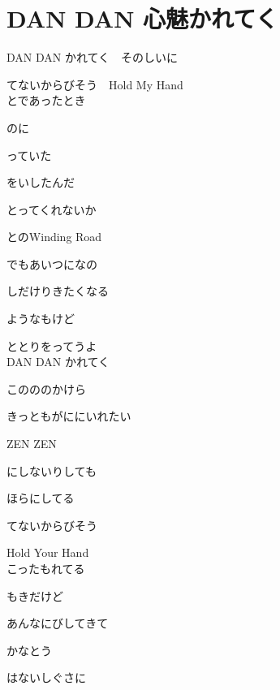 \section{ DAN DAN 心魅かれてく}
\large{

DAN DAN かれてく　そのしいに

てないからびそう　Hold My Hand
\\

とであったとき　

のに

っていた　

をいしたんだ

とってくれないか　

とのWinding Road

でもあいつになの

しだけりきたくなる　

ようなもけど

ととりをってうよ
\\

DAN DAN かれてく　

このののかけら

きっともがににいれたい

ZEN ZEN　

にしないりしても　

ほらにしてる

てないからびそう　

Hold Your Hand
\\

こったもれてる　

もきだけど

あんなにびしてきて　

かなとう

はないしぐさに　

}
